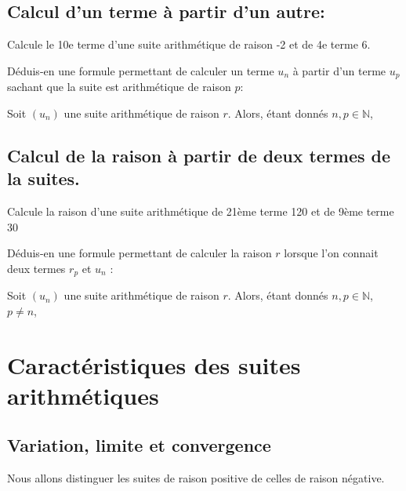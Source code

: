 \documentclass[a4paper,12pt]{report}
\newcommand{\IN}{\mathbb{N}}
\begin{document}
\subsection{Calcul d'un terme à partir d'un autre:}
\label{sec:org5226575}

Calcule le 10e terme d'une suite arithmétique de raison -2 et de 4e
terme 6.

\dotfill

\dotfill

\dotfill

\dotfill

\dotfill

Déduis-en une formule permettant de calculer un terme \(u_n\) à partir
d'un terme \(u_p\) sachant que la suite est arithmétique de raison \(p\):

\begin{propriete}


Soit \((u_n)\) une suite arithmétique de raison \(r\).
Alors, étant donnés \(n,p\in\IN\),

\dotfill
\end{propriete}

\subsection{Calcul de la raison à partir de deux termes de la suites.}
\label{sec:orgdf56e3b}

Calcule la raison d’une suite arithmétique de 21ème terme 120 et de
9ème terme 30

\dotfill

\dotfill

\dotfill

\dotfill

\dotfill

Déduis-en une formule permettant de calculer la raison \(r\) lorsque l’on connait deux termes
\(r_p\) et \(u_n\) :
\begin{propriete}


Soit \((u_n)\) une suite arithmétique de raison \(r\). Alors, étant donnés \(n,p\in\IN\), \(p\neq n\),  \dotfill
\end{propriete}

\section{Caractéristiques des suites arithmétiques}
\label{sec:org2a72294}

\subsection{Variation, limite et convergence}
\label{sec:orgce8967b}
Nous allons distinguer les suites de raison positive de celles de
raison négative.
\end{document}
